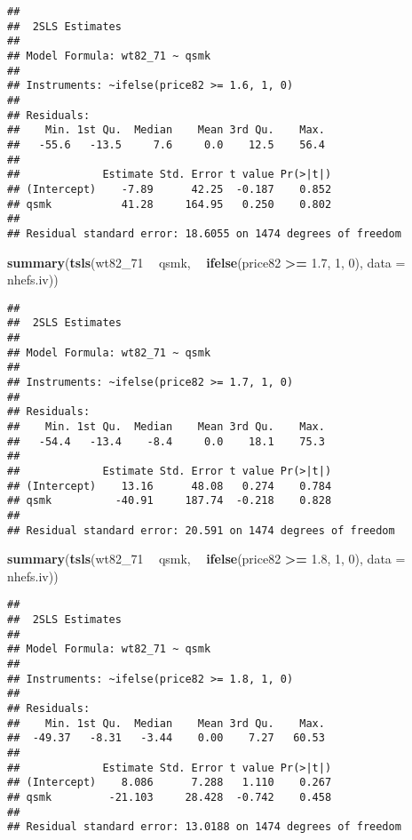 \documentclass[10pt,]{book}
\newenvironment{Shaded}{\begin{snugshade}}{\end{snugshade}}
\newcommand{\DataTypeTok}[1]{\textcolor[rgb]{0.13,0.29,0.53}{#1}}
\newcommand{\DecValTok}[1]{\textcolor[rgb]{0.00,0.00,0.81}{#1}}
\newcommand{\FloatTok}[1]{\textcolor[rgb]{0.00,0.00,0.81}{#1}}
\newcommand{\KeywordTok}[1]{\textcolor[rgb]{0.13,0.29,0.53}{\textbf{#1}}}
\newcommand{\NormalTok}[1]{#1}
\newcommand{\OperatorTok}[1]{\textcolor[rgb]{0.81,0.36,0.00}{\textbf{#1}}}
\newcommand{\StringTok}[1]{\textcolor[rgb]{0.31,0.60,0.02}{#1}}
\begin{document}
\begin{verbatim}
## 
##  2SLS Estimates
## 
## Model Formula: wt82_71 ~ qsmk
## 
## Instruments: ~ifelse(price82 >= 1.6, 1, 0)
## 
## Residuals:
##    Min. 1st Qu.  Median    Mean 3rd Qu.    Max. 
##   -55.6   -13.5     7.6     0.0    12.5    56.4 
## 
##             Estimate Std. Error t value Pr(>|t|)
## (Intercept)    -7.89      42.25  -0.187    0.852
## qsmk           41.28     164.95   0.250    0.802
## 
## Residual standard error: 18.6055 on 1474 degrees of freedom
\end{verbatim}

\begin{Shaded}
\begin{Highlighting}[]
\KeywordTok{summary}\NormalTok{(}\KeywordTok{tsls}\NormalTok{(wt82_}\DecValTok{71} \OperatorTok{~}\StringTok{ }\NormalTok{qsmk, }\OperatorTok{~}\StringTok{ }\KeywordTok{ifelse}\NormalTok{(price82 }\OperatorTok{>=}\StringTok{ }\FloatTok{1.7}\NormalTok{, }\DecValTok{1}\NormalTok{, }\DecValTok{0}\NormalTok{), }\DataTypeTok{data =}\NormalTok{ nhefs.iv))}
\end{Highlighting}
\end{Shaded}

\begin{verbatim}
## 
##  2SLS Estimates
## 
## Model Formula: wt82_71 ~ qsmk
## 
## Instruments: ~ifelse(price82 >= 1.7, 1, 0)
## 
## Residuals:
##    Min. 1st Qu.  Median    Mean 3rd Qu.    Max. 
##   -54.4   -13.4    -8.4     0.0    18.1    75.3 
## 
##             Estimate Std. Error t value Pr(>|t|)
## (Intercept)    13.16      48.08   0.274    0.784
## qsmk          -40.91     187.74  -0.218    0.828
## 
## Residual standard error: 20.591 on 1474 degrees of freedom
\end{verbatim}

\begin{Shaded}
\begin{Highlighting}[]
\KeywordTok{summary}\NormalTok{(}\KeywordTok{tsls}\NormalTok{(wt82_}\DecValTok{71} \OperatorTok{~}\StringTok{ }\NormalTok{qsmk, }\OperatorTok{~}\StringTok{ }\KeywordTok{ifelse}\NormalTok{(price82 }\OperatorTok{>=}\StringTok{ }\FloatTok{1.8}\NormalTok{, }\DecValTok{1}\NormalTok{, }\DecValTok{0}\NormalTok{), }\DataTypeTok{data =}\NormalTok{ nhefs.iv))}
\end{Highlighting}
\end{Shaded}

\begin{verbatim}
## 
##  2SLS Estimates
## 
## Model Formula: wt82_71 ~ qsmk
## 
## Instruments: ~ifelse(price82 >= 1.8, 1, 0)
## 
## Residuals:
##    Min. 1st Qu.  Median    Mean 3rd Qu.    Max. 
##  -49.37   -8.31   -3.44    0.00    7.27   60.53 
## 
##             Estimate Std. Error t value Pr(>|t|)
## (Intercept)    8.086      7.288   1.110    0.267
## qsmk         -21.103     28.428  -0.742    0.458
## 
## Residual standard error: 13.0188 on 1474 degrees of freedom
\end{verbatim}
\end{document}

